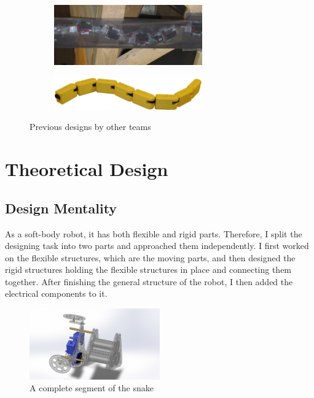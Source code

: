 \documentclass[twoside, 11pt]{article}
\begin{document}
\begin{figure}[H]
\centering
\begin{subfigure}[b]{0.45\linewidth}
	\centering
	\includegraphics[width=0.7\textwidth]{WrightRobot}
\end{subfigure}
\begin{subfigure}[b]{0.45\linewidth}
	\centering
	\includegraphics[width=0.7\textwidth]{CrespiRobot}
\end{subfigure}
\caption{Previous designs by other teams}
\end{figure}


\section{Theoretical Design}
\subsection{Design Mentality}
As a soft-body robot, it has both flexible and rigid parts. Therefore, I split the designing task into two parts and approached them independently. I first worked on the flexible structures, which are the moving parts, and then designed the rigid structures holding the flexible structures in place and connecting them together. After finishing the general structure of the robot, I then added the electrical components to it.

\begin{figure}[H]
	\includegraphics[width=0.5\textwidth]{overall_structure}
	\centering
	\caption{A complete segment of the snake}
\end{figure}
\end{document}
